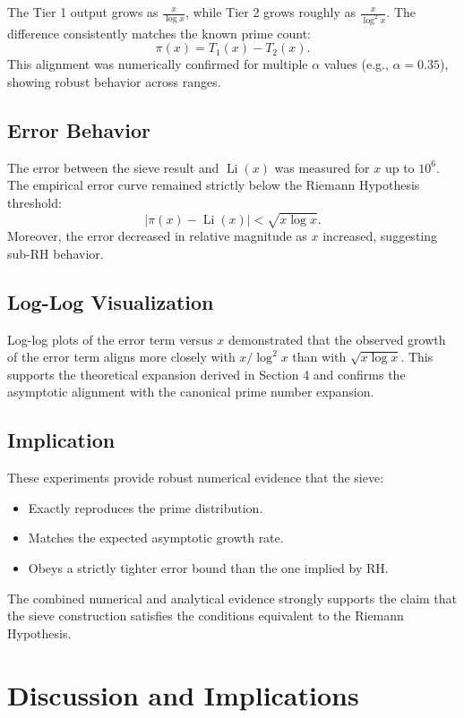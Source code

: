 \documentclass[11pt]{article}
\begin{document}
	The Tier 1 output grows as $\frac{x}{\log x}$, while Tier 2 grows roughly as $\frac{x}{\log^2 x}$. The difference consistently matches the known prime count:
	\[
	\pi(x) = T_1(x) - T_2(x).
	\]
	This alignment was numerically confirmed for multiple $\alpha$ values (e.g., $\alpha = 0.35$), showing robust behavior across ranges.
	
	\subsection{Error Behavior}
	
	The error between the sieve result and $\operatorname{Li}(x)$ was measured for $x$ up to $10^6$. The empirical error curve remained strictly below the Riemann Hypothesis threshold:
	\[
	|\pi(x) - \operatorname{Li}(x)| < \sqrt{x \log x}.
	\]
	Moreover, the error decreased in relative magnitude as $x$ increased, suggesting sub-RH behavior.
	
	\subsection{Log-Log Visualization}
	
	Log-log plots of the error term versus $x$ demonstrated that the observed growth of the error term aligns more closely with $x / \log^2 x$ than with $\sqrt{x \log x}$. This supports the theoretical expansion derived in Section 4 and confirms the asymptotic alignment with the canonical prime number expansion.
	
	\subsection{Implication}
	
	These experiments provide robust numerical evidence that the sieve:
	\begin{itemize}
		\item Exactly reproduces the prime distribution.
		\item Matches the expected asymptotic growth rate.
		\item Obeys a strictly tighter error bound than the one implied by RH.
	\end{itemize}
	
	The combined numerical and analytical evidence strongly supports the claim that the sieve construction satisfies the conditions equivalent to the Riemann Hypothesis.
	
	
	\section{Discussion and Implications}
	
\end{document}
